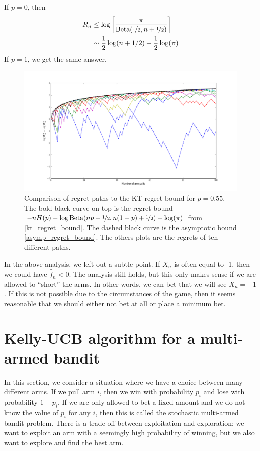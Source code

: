 \documentclass[letterpaper]{article}
\numberwithin{equation}{section}
\theoremstyle{plain}
\begin{document}
If $p=0$, then
\begin{align}
R_n &\le \log\left[\frac{\pi}{\text{Beta}(\nicefrac{1}{2}, n + \nicefrac{1}{2})}\right]\\
&\sim \frac{1}{2}\log(n+1/2) + \frac{1}{2}\log(\pi)
\end{align}
If $p=1$, we get the same answer.
\begin{figure}[ht]
\centering
\includegraphics[width=1\textwidth]{single_arm_kt_regret.png}
\caption{Comparison of regret paths to the KT regret bound for $p=0.55$. The bold black curve on top is the regret bound $-nH(p) -\log \text{Beta}(np+\nicefrac{1}{2}, n(1-p)+\nicefrac{1}{2}) + \log(\pi)$ from \eqref{kt_regret_bound}. The dashed black curve is the asymptotic bound \eqref{asymp_regret_bound}. The others plots are the regrets of ten different paths.}
\label{single_arm_regret_figure}
\end{figure}

In the above analysis, we left out a subtle point. If $X_n$ is often equal to -1, then we could have $\hat{f}_n < 0$. The analysis still holds, but this only makes sense if we are allowed to ``short'' the arms. In other words, we can bet that we will see $X_n=-1$. If this is not possible due to the circumstances of the game, then it seems reasonable that we should either not bet at all or place a minimum bet.


\section{Kelly-UCB algorithm for a multi-armed bandit}\label{mab}
In this section, we consider a situation where we have a choice between many different arms. If we pull arm $i$, then we win with probability $p_i$ and lose with probability $1-p_i$. If we are only allowed to bet a fixed amount and we do not know the value of $p_i$ for any $i$, then this is called the stochastic multi-armed bandit problem. There is a trade-off between exploitation and exploration: we want to exploit an arm with a seemingly high probability of winning, but we also want to explore and find the best arm.
\end{document}
